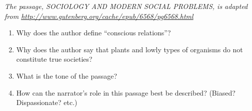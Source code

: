 \textit{The passage, SOCIOLOGY AND MODERN SOCIAL PROBLEMS, is adapted from \url{http://www.gutenberg.org/cache/epub/6568/pg6568.html}}

\bigskip
\begin{spacing}{1.5}
\begin{enumerate}
\item Why does the author define ``conscious relations''? \hrulefill
\item Why does the author say that plants and lowly types of organisms do not constitute true societies? \hrulefill
\item What is the tone of the passage? \hrulefill
\item How can the narrator's role in this passage best be described? (Biased? Dispassionate? etc.) \hrulefill
\end{enumerate}
\end{spacing}